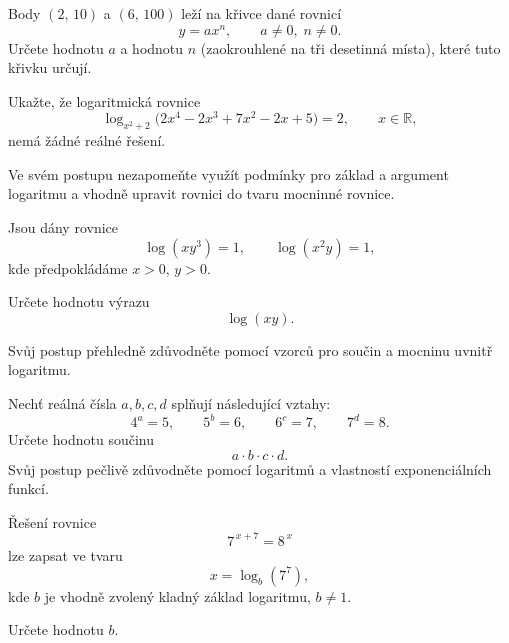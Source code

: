 \documentclass[12pt,a4paper]{article}
\begin{document}
\begin{exercise}
    Body $(2,\,10)$ a $(6,\,100)$ leží na křivce dané rovnicí
    \[
        y = a x^{n},
        \qquad a \ne 0,\; n \ne 0.
    \]
    Určete hodnotu $a$ a hodnotu $n$ (zaokrouhlené na tři desetinná místa),
    které tuto křivku určují.
\end{exercise}


\begin{exercise}
    Ukažte, že logaritmická rovnice
    \[
        \log_{x^{2} + 2}\!\bigl(2x^{4} - 2x^{3} + 7x^{2} - 2x + 5\bigr) = 2,
        \qquad x \in \mathbb{R},
    \]
    nemá žádné reálné řešení.

    Ve svém postupu nezapomeňte využít podmínky pro základ a argument
    logaritmu a vhodně upravit rovnici do tvaru mocninné rovnice.
\end{exercise}


\setcounter{section}{4}
\begin{exercise}
    Jsou dány rovnice
    \[
        \log(xy^{3}) = 1,
        \qquad
        \log(x^{2}y) = 1,
    \]
    kde předpokládáme $x>0$, $y>0$.
    
    Určete hodnotu výrazu
    \[
        \log(xy).
    \]

    Svůj postup přehledně zdůvodněte pomocí vzorců pro součin a mocninu uvnitř logaritmu.
\end{exercise}


\begin{exercise}
    Nechť reálná čísla $a, b, c, d$ splňují následující vztahy:
    \[
        4^{a} = 5, \qquad
        5^{b} = 6, \qquad
        6^{c} = 7, \qquad
        7^{d} = 8.
    \]
    Určete hodnotu součinu
    \[
        a \cdot b \cdot c \cdot d.
    \]
    Svůj postup pečlivě zdůvodněte pomocí logaritmů a vlastností exponenciálních funkcí.
\end{exercise}


\begin{exercise}
    Řešení rovnice
    \[
        7^{\,x+7} = 8^{\,x}
    \]
    lze zapsat ve tvaru
    \[
        x = \log_{b}\!\left(7^{7}\right),
    \]
    kde $b$ je vhodně zvolený kladný základ logaritmu, $b \neq 1$.

    Určete hodnotu $b$.
\end{exercise}
\end{document}
